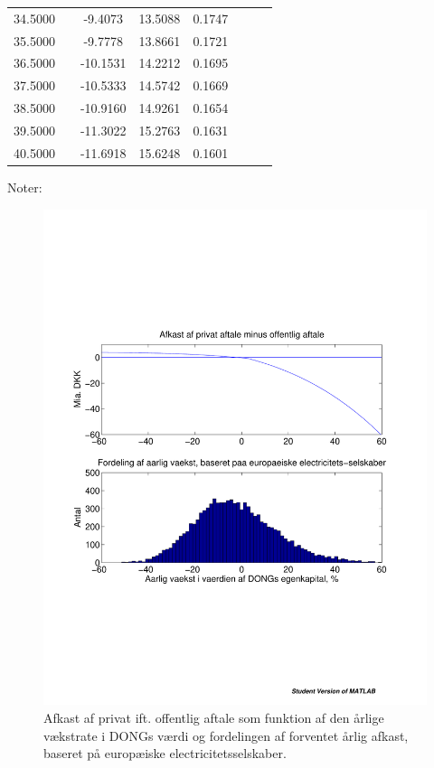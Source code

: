 \documentclass{article}
\begin{document}
\begin{table}[h]
\begin{tabularx}{0.95\linewidth}{cXcccccr}
34.5000&&-9.4073&13.5088& 0.1747\\
35.5000&&-9.7778&13.8661& 0.1721\\
36.5000&&-10.1531&14.2212& 0.1695\\
37.5000&&-10.5333&14.5742& 0.1669\\
38.5000&&-10.9160&14.9261& 0.1654\\
39.5000&&-11.3022&15.2763& 0.1631\\
40.5000&&-11.6918&15.6248& 0.1601\\
		\bottomrule[1pt]
	\end{tabularx}
	\begin{minipage}{\linewidth}
		\footnotesize{Noter: }
	\end{minipage}
\end{table}


\begin{figure}
\includegraphics[scale=0.8]{../matlab/figs/afkast_hist_combine_elec}
\caption{Afkast af privat ift. offentlig aftale som funktion af den årlige v\ae{}kstrate i DONGs v\ae{}rdi og fordelingen af forventet \aa{}rlig afkast, baseret p\aa{} europ\ae{}iske electricitetsselskaber.}
\label{fig:combine1}
\end{figure}
\end{document}
